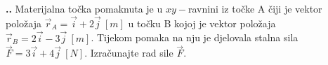 \noindent 
\textbf{
\thecjelina.\thezadatak.}
Materijalna točka pomaknuta je u $xy-$ravnini iz točke A čiji je vektor položaja $\vec{r}_A=\vec{i}+2\vec{j}\ \left[m\right]$ u točku B kojoj je vektor položaja 
$\vec{r}_B=2\vec{i}-3\vec{j}\ \left[m\right]$. Tijekom pomaka na nju je djelovala stalna sila $\vec{F}=3\vec{i}+4\vec{j}\ \left[N\right]$.
Izračunajte rad sile $\vec{F}$.

